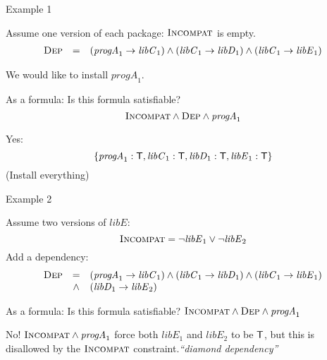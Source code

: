 \documentclass[xetex,aspectratio=169,14pt,hyperref={pdfpagelabels=true,pdflang={en-GB}}]{beamer}
\begin{document}
\begin{frame}
  {Example 1}

  Assume one version of each package: $\textsc{Incompat}$ is empty.
  \begin{displaymath}
    \begin{array}{lcl}
      \textsc{Dep}&=&(\mathit{progA}_1 \to \mathit{libC}_1) \land (\mathit{libC}_1 \to \mathit{libD}_1) \land (\mathit{libC}_1 \to \mathit{libE}_1)
    \end{array}
  \end{displaymath}

  \pause
  \bigskip

  We would like to install $\mathit{progA}_1$.

  \pause
  \bigskip

  As a formula: Is this formula satisfiable?
  \begin{displaymath}
    \textsc{Incompat} \land \textsc{Dep} \land \mathit{progA}_1
  \end{displaymath}

  \pause
  \bigskip

  Yes:
  \begin{displaymath}
    \{ \mathit{progA}_1 : \mathsf{T}, \mathit{libC}_1 : \mathsf{T}, \mathit{libD}_1 : \mathsf{T}, \mathit{libE}_1 : \mathsf{T} \}
  \end{displaymath}
  \textcolor{black!60}{(Install everything)}
\end{frame}

\begin{frame}
  {Example 2}

  Assume two versions of $\mathit{libE}$:
  \begin{displaymath}
    \textsc{Incompat} = \lnot \mathit{libE}_1 \lor \lnot \mathit{libE}_2
  \end{displaymath}
  Add a dependency:
  \begin{displaymath}
    \begin{array}{lcl}
      \textsc{Dep}&=&(\mathit{progA}_1 \to \mathit{libC}_1) \land (\mathit{libC}_1 \to \mathit{libD}_1) \land (\mathit{libC}_1 \to \mathit{libE}_1) \\
                  &\land&(\mathit{libD}_1 \to \mathit{libE}_2)
    \end{array}
  \end{displaymath}



  \pause

  As a formula: Is this formula satisfiable? $\textsc{Incompat} \land \textsc{Dep} \land \mathit{progA}_1$

  \pause
  \smallskip

  No! $\textsc{Incompat} \land \mathit{progA}_1$ force both
  $\mathit{libE}_1$ and $\mathit{libE}_2$ to be $\mathsf{T}$, but this is
  disallowed by the $\textsc{Incompat}$
  constraint.\emph{\textcolor{black!60}{``diamond dependency''}}

\end{frame}
\end{document}
